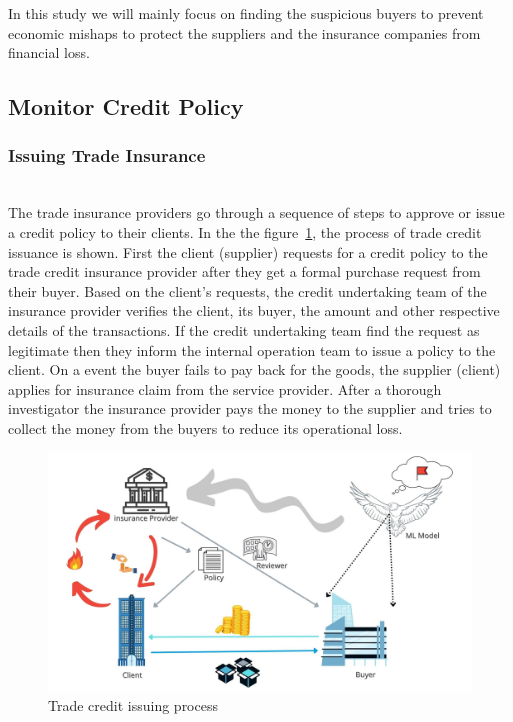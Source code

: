 In this study we will mainly focus on finding the suspicious buyers to prevent economic mishaps to protect the suppliers and the insurance companies from financial loss.


\subsection{Monitor Credit Policy}\label{subsec:monitor-credit-policy}

\subsubsection{Issuing Trade Insurance}\hspace*{\fill} \\
The trade insurance providers go through a sequence of steps to approve or issue a credit policy to their clients. In the the figure~\ref{fig:trade_credit}, the process of trade credit issuance is shown. First the client (supplier) requests for a credit policy to the trade credit insurance provider after they get a formal purchase request from their buyer. Based on the client's requests, the credit undertaking team of the insurance provider verifies the client, its buyer, the amount and other respective details of the transactions. If the credit undertaking team find the request as legitimate then they inform the internal operation team to issue a policy to the client. On a event the buyer fails to pay back for the goods, the supplier (client) applies for insurance claim from the service provider. After a thorough investigator the insurance provider pays the money to the supplier and tries to collect the money from the buyers to reduce its operational loss.

\begin{figure}[htp]
    \centering
    \includegraphics[width=\linewidth]{figures/monitor_buyers.jpg}
    \caption{Trade credit issuing process}
    \label{fig:trade_credit}
\end{figure}


